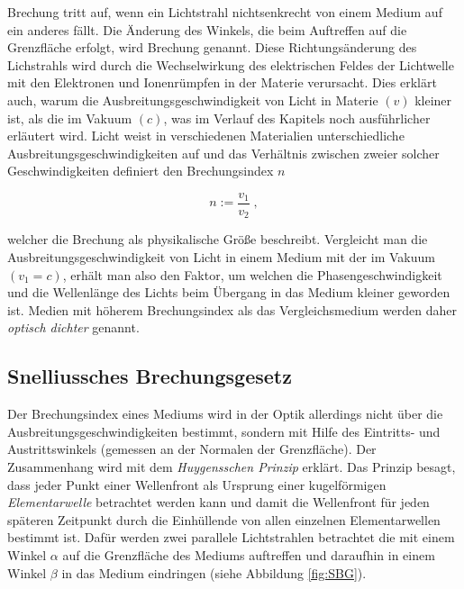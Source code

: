 Brechung tritt auf, wenn ein Lichtstrahl nichtsenkrecht von einem Medium auf ein anderes fällt. Die Änderung des Winkels, die beim Auftreffen auf die Grenzfläche erfolgt, wird Brechung genannt. Diese Richtungsänderung des Lichstrahls wird durch die Wechselwirkung des elektrischen Feldes der Lichtwelle mit den Elektronen und Ionenrümpfen in der Materie verursacht.
Dies erklärt auch, warum die Ausbreitungsgeschwindigkeit von Licht in Materie $(v)$ kleiner ist, als die im Vakuum $(c)$, was im Verlauf des Kapitels noch ausführlicher erläutert wird.
Licht weist in verschiedenen Materialien unterschiedliche Ausbreitungsgeschwindigkeiten auf und das Verhältnis zwischen zweier solcher Geschwindigkeiten definiert den Brechungsindex $n$

\begin{equation}
  n := \frac{v_1}{v_2} \; ,
  \label{equ:n}
\end{equation}

welcher die Brechung als physikalische Größe beschreibt. Vergleicht man die Ausbreitungsgeschwindigkeit von Licht in einem Medium mit der im Vakuum $(v_1 = c)$, erhält man also den Faktor, um welchen die Phasengeschwindigkeit und
die Wellenlänge des Lichts beim Übergang in das Medium kleiner geworden ist. Medien mit höherem Brechungsindex als das Vergleichsmedium werden daher \emph{optisch dichter} genannt.

\subsection{Snelliussches Brechungsgesetz}
Der Brechungsindex eines Mediums wird in der Optik allerdings nicht über die
Ausbreitungsgeschwindigkeiten bestimmt, sondern mit Hilfe des Eintritts- und
Austrittswinkels (gemessen an der Normalen der Grenzfläche). Der Zusammenhang wird mit dem \emph{Huygensschen Prinzip} erklärt. Das Prinzip besagt, dass jeder Punkt einer Wellenfront als Ursprung einer kugelförmigen \emph{Elementarwelle} betrachtet werden kann und damit die Wellenfront für jeden späteren Zeitpunkt durch die Einhüllende von allen einzelnen Elementarwellen bestimmt ist.
Dafür werden zwei parallele Lichtstrahlen betrachtet die mit einem Winkel $\alpha$
auf die Grenzfläche des Mediums auftreffen und daraufhin in einem Winkel $\beta$ in das Medium eindringen (siehe Abbildung \ref{fig:SBG}).

